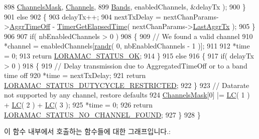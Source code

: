 \begin{DoxyCode}
898                                                       \mbox{\hyperlink{_region_i_n865_8c_a2188957b5ca6af8092154d7ccbfa5757}{ChannelsMask}}, 
      \mbox{\hyperlink{_region_i_n865_8c_adad6dcb99199b5142166021a8aac9aa2}{Channels}},
899                                                       \mbox{\hyperlink{_region_i_n865_8c_a9250eb5b8133c0d3c631dee6283deb17}{Bands}}, enabledChannels, &delayTx );
900     \}
901     \textcolor{keywordflow}{else}
902     \{
903         delayTx++;
904         nextTxDelay = nextChanParams->\mbox{\hyperlink{structs_next_chan_params_a3609676d2d3b7c00e25615324b35cb26}{AggrTimeOff}} - 
      \mbox{\hyperlink{time_server_8c_a9ca7e27f3d6474daff63f2e093a2e91e}{TimerGetElapsedTime}}( nextChanParams->\mbox{\hyperlink{structs_next_chan_params_a381b728f60b185ecf3313e974c18768b}{LastAggrTx}} );
905     \}
906 
907     \textcolor{keywordflow}{if}( nbEnabledChannels > 0 )
908     \{
909         \textcolor{comment}{// We found a valid channel}
910         *channel = enabledChannels[\mbox{\hyperlink{utilities_8c_af5d8ad6dae489ac64821e7d4f004595d}{randr}}( 0, nbEnabledChannels - 1 )];
911 
912         *time = 0;
913         \textcolor{keywordflow}{return} \mbox{\hyperlink{group___l_o_r_a_m_a_c_gga1d18f26b344040b3ec5c3db662919661a03db5fca052313edb3823c014b653a74}{LORAMAC\_STATUS\_OK}};
914     \}
915     \textcolor{keywordflow}{else}
916     \{
917         \textcolor{keywordflow}{if}( delayTx > 0 )
918         \{
919             \textcolor{comment}{// Delay transmission due to AggregatedTimeOff or to a band time off}
920             *time = nextTxDelay;
921             \textcolor{keywordflow}{return} \mbox{\hyperlink{group___l_o_r_a_m_a_c_gga1d18f26b344040b3ec5c3db662919661a0c982ada0769ecee2e1041fb6945ddd4}{LORAMAC\_STATUS\_DUTYCYCLE\_RESTRICTED}};
922         \}
923         \textcolor{comment}{// Datarate not supported by any channel, restore defaults}
924         \mbox{\hyperlink{_region_i_n865_8c_a2188957b5ca6af8092154d7ccbfa5757}{ChannelsMask}}[0] |= \mbox{\hyperlink{group___r_e_g_i_o_n_ga12fa17e5c1016e01a9d82c25027deb1b}{LC}}( 1 ) + \mbox{\hyperlink{group___r_e_g_i_o_n_ga12fa17e5c1016e01a9d82c25027deb1b}{LC}}( 2 ) + \mbox{\hyperlink{group___r_e_g_i_o_n_ga12fa17e5c1016e01a9d82c25027deb1b}{LC}}( 3 );
925         *time = 0;
926         \textcolor{keywordflow}{return} \mbox{\hyperlink{group___l_o_r_a_m_a_c_gga1d18f26b344040b3ec5c3db662919661a393266a9952cf6617917f1fce181efcd}{LORAMAC\_STATUS\_NO\_CHANNEL\_FOUND}};
927     \}
928 \}
\end{DoxyCode}
이 함수 내부에서 호출하는 함수들에 대한 그래프입니다.\+:
\mbox{\label{group___r_e_g_i_o_n_i_n865_ga2d222860d58d1d5175f0486b572870c5}} 

